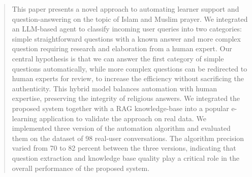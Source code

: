 \begin{abstract}
This paper presents a novel approach to automating learner support and question-answering on the topic of Islam and Muslim prayer. We integrated an LLM-based agent to classify incoming user queries into two categories: simple straightforward questions with a known answer and more complex question requiring research and elaboration from a human expert. Our central hypothesis is that we can answer the first category of simple questions automatically, while more complex questions can be redirected to human experts for review, to increase the efficiency without sacrificing the authenticity. This hybrid model balances automation with human expertise, preserving the integrity of religious answers. We integrated the proposed system together with a RAG knowledge-base into a popular e-learning application to validate the approach on real data. We implemented three version of the automation algorithm and evaluated them on the dataset of 98 real-user conversations. The algorithm precision varied from 70 to 82 percent between the three versions, indicating that question extraction and knowledge base quality play a critical role in the overall performance of the proposed system.
\end{abstract}